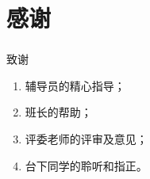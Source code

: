 \section*{感谢}
\frame
{	\frametitle{\secname}
	\begin{block}{致谢}
		\begin{enumerate}
			\item 辅导员的精心指导；
			\item 班长的帮助；
			\item 评委老师的评审及意见；
			\item 台下同学的聆听和指正。
		\end{enumerate}
	\end{block}
}